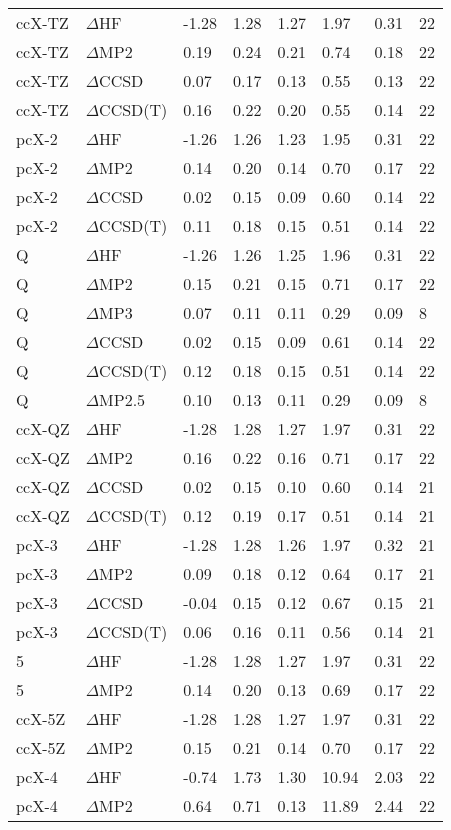 \begin{table}
\begin{tabular}{l l l l l l l l }
    ccX-TZ & $\Delta$HF & -1.28 & 1.28 & 1.27 & 1.97 & 0.31 & 22 \\ 
    ccX-TZ & $\Delta$MP2 & 0.19 & 0.24 & 0.21 & 0.74 & 0.18 & 22 \\ 
    ccX-TZ & $\Delta$CCSD & 0.07 & 0.17 & 0.13 & 0.55 & 0.13 & 22 \\ 
    ccX-TZ & $\Delta$CCSD(T) & 0.16 & 0.22 & 0.20 & 0.55 & 0.14 & 22 \\ 
    pcX-2 & $\Delta$HF & -1.26 & 1.26 & 1.23 & 1.95 & 0.31 & 22 \\ 
    pcX-2 & $\Delta$MP2 & 0.14 & 0.20 & 0.14 & 0.70 & 0.17 & 22 \\ 
    pcX-2 & $\Delta$CCSD & 0.02 & 0.15 & 0.09 & 0.60 & 0.14 & 22 \\ 
    pcX-2 & $\Delta$CCSD(T) & 0.11 & 0.18 & 0.15 & 0.51 & 0.14 & 22 \\ 
    Q & $\Delta$HF & -1.26 & 1.26 & 1.25 & 1.96 & 0.31 & 22 \\ 
    Q & $\Delta$MP2 & 0.15 & 0.21 & 0.15 & 0.71 & 0.17 & 22 \\ 
    Q & $\Delta$MP3 & 0.07 & 0.11 & 0.11 & 0.29 & 0.09 & 8 \\ 
    Q & $\Delta$CCSD & 0.02 & 0.15 & 0.09 & 0.61 & 0.14 & 22 \\ 
    Q & $\Delta$CCSD(T) & 0.12 & 0.18 & 0.15 & 0.51 & 0.14 & 22 \\ 
    Q & $\Delta$MP2.5 & 0.10 & 0.13 & 0.11 & 0.29 & 0.09 & 8 \\ 
    ccX-QZ & $\Delta$HF & -1.28 & 1.28 & 1.27 & 1.97 & 0.31 & 22 \\ 
    ccX-QZ & $\Delta$MP2 & 0.16 & 0.22 & 0.16 & 0.71 & 0.17 & 22 \\ 
    ccX-QZ & $\Delta$CCSD & 0.02 & 0.15 & 0.10 & 0.60 & 0.14 & 21 \\ 
    ccX-QZ & $\Delta$CCSD(T) & 0.12 & 0.19 & 0.17 & 0.51 & 0.14 & 21 \\ 
    pcX-3 & $\Delta$HF & -1.28 & 1.28 & 1.26 & 1.97 & 0.32 & 21 \\ 
    pcX-3 & $\Delta$MP2 & 0.09 & 0.18 & 0.12 & 0.64 & 0.17 & 21 \\ 
    pcX-3 & $\Delta$CCSD & -0.04 & 0.15 & 0.12 & 0.67 & 0.15 & 21 \\ 
    pcX-3 & $\Delta$CCSD(T) & 0.06 & 0.16 & 0.11 & 0.56 & 0.14 & 21 \\ 
    5 & $\Delta$HF & -1.28 & 1.28 & 1.27 & 1.97 & 0.31 & 22 \\ 
    5 & $\Delta$MP2 & 0.14 & 0.20 & 0.13 & 0.69 & 0.17 & 22 \\ 
    ccX-5Z & $\Delta$HF & -1.28 & 1.28 & 1.27 & 1.97 & 0.31 & 22 \\ 
    ccX-5Z & $\Delta$MP2 & 0.15 & 0.21 & 0.14 & 0.70 & 0.17 & 22 \\ 
    pcX-4 & $\Delta$HF & -0.74 & 1.73 & 1.30 & 10.94 & 2.03 & 22 \\ 
    pcX-4 & $\Delta$MP2 & 0.64 & 0.71 & 0.13 & 11.89 & 2.44 & 22 \\ 
    \bottomrule
  \end{tabular}
\end{table}
